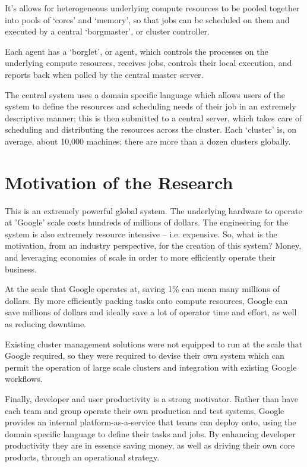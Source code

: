 \documentclass[runningheads,a4paper]{llncs}
\begin{document}
It’s allows for heterogeneous underlying compute resources to be pooled together into pools of ‘cores’ and ‘memory’, so that jobs can be scheduled on them and executed by a central ‘borgmaster’, or cluster controller.

Each agent has a ‘borglet’, or agent, which controls the processes on the underlying compute resources, receives jobs, controls their local execution, and reports back when polled by the central master server.

The central system uses a domain specific language which allows users of the system to define the resources and scheduling needs of their job in an extremely descriptive manner; this is then submitted to a central server, which takes care of scheduling and distributing the resources across the cluster.  Each ‘cluster’ is, on average, about 10,000 machines; there are more than a dozen clusters globally.  

\section{Motivation of the Research}
This is an extremely powerful global system.  The underlying hardware to operate at 'Google' scale costs hundreds of millions of dollars.  The engineering for the system is also extremely resource intensive -- i.e. expensive.  So, what is the motivation, from an industry perspective, for the creation of this system?  Money, and leveraging economies of scale in order to more efficiently operate their business.

At the scale that Google operates at, saving 1\% can mean many millions of dollars.  By more efficiently packing tasks onto compute resources, Google can save  millions of dollars and ideally save a lot of operator time and effort, as well as reducing downtime. 

Existing cluster management solutions were not equipped to run at the scale that Google required, so they were required to  devise their own system which can permit the operation of large scale clusters and integration with existing Google workflows.

Finally, developer and user productivity is a strong motivator.  Rather than have each team and group operate their own production and test systems, Google provides an internal platform-as-a-service that teams can deploy onto, using the domain specific language to define their tasks and jobs.  By enhancing developer productivity they are in essence saving money, as well as driving their own core products, through an operational strategy.  
\end{document}
